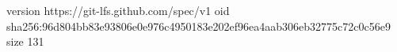 version https://git-lfs.github.com/spec/v1
oid sha256:96d804bb83e93806e0e976c4950183e202ef96ea4aab306eb32775c72c0c56e9
size 131
